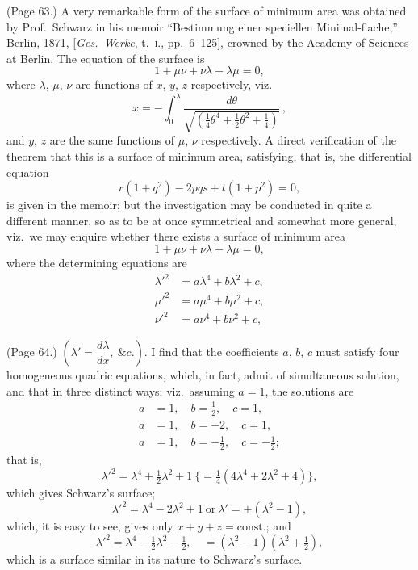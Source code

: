 \documentclass[11pt,a4paper]{article}
\begin{document}
\medskip

\noindent (Page 63.) A very remarkable form of the surface of minimum area was obtained by Prof.\ Schwarz in his memoir ``Bestimmung einer speciellen Minimal-flache,'' Berlin, 1871, [\textit{Ges.\ Werke}, t.~\textsc{i}., pp.~6--125], crowned by the Academy of Sciences at Berlin. The equation of the surface is
\[
1 + \mu\nu + \nu\lambda + \lambda\mu = 0,
\]
where $\lambda$, $\mu$, $\nu$ are functions of $x$, $y$, $z$ respectively, viz.
\[
x = -\int_0^\lambda \frac{d\theta}{\sqrt{(\tfrac{1}{4}\theta^4 + \tfrac{1}{2}\theta^2 + \tfrac{1}{4})}}\,,
\]
and $y$, $z$ are the same functions of $\mu$, $\nu$ respectively. A direct verification of the theorem that this is a surface of minimum area, satisfying, that is, the differential equation
\[
r(1 + q^2) - 2pqs + t(1 + p^2) = 0,
\]
is given in the memoir; but the investigation may be conducted in quite a different manner, so as to be at once symmetrical and somewhat more general, viz.\ we may enquire whether there exists a surface of minimum area
\[
1 + \mu\nu + \nu\lambda + \lambda\mu = 0,
\]
where the determining equations are
\begin{align*}
\lambda'^2 &= a\lambda^4 + b\lambda^2 + c, \\
\mu'^2 &= a\mu^4 + b\mu^2 + c, \\
\nu'^2 &= a\nu^4 + b\nu^2 + c,
\end{align*}

\bigskip

\noindent (Page 64.) $\left(\lambda' = \dfrac{d\lambda}{dx},\ \&c.\right)$. I find that the coefficients $a$, $b$, $c$ must satisfy four homogeneous quadric equations, which, in fact, admit of simultaneous solution, and that in three distinct ways; viz.\ assuming $a = 1$, the solutions are
\begin{align*}
a &= 1,\quad b = \tfrac{1}{2},\quad c = 1, \\
a &= 1,\quad b = -2,\quad c = 1, \\
a &= 1,\quad b = -\tfrac{1}{2},\quad c = -\tfrac{1}{2};
\end{align*}
that is,
\[
\lambda'^2 = \lambda^4 + \tfrac{1}{2}\lambda^2 + 1\ \{= \tfrac{1}{4}(4\lambda^4 + 2\lambda^2 + 4)\},
\]
which gives Schwarz's surface;
\[
\lambda'^2 = \lambda^4 - 2\lambda^2 + 1\ \text{or}\ \lambda' = \pm(\lambda^2 - 1),
\]
which, it is easy to see, gives only $x + y + z = \text{const.}$; and
\[
\lambda'^2 = \lambda^4 - \tfrac{1}{2}\lambda^2 - \tfrac{1}{2},\quad = (\lambda^2 - 1)(\lambda^2 + \tfrac{1}{2}),
\]
which is a surface similar in its nature to Schwarz's surface.
\end{document}
